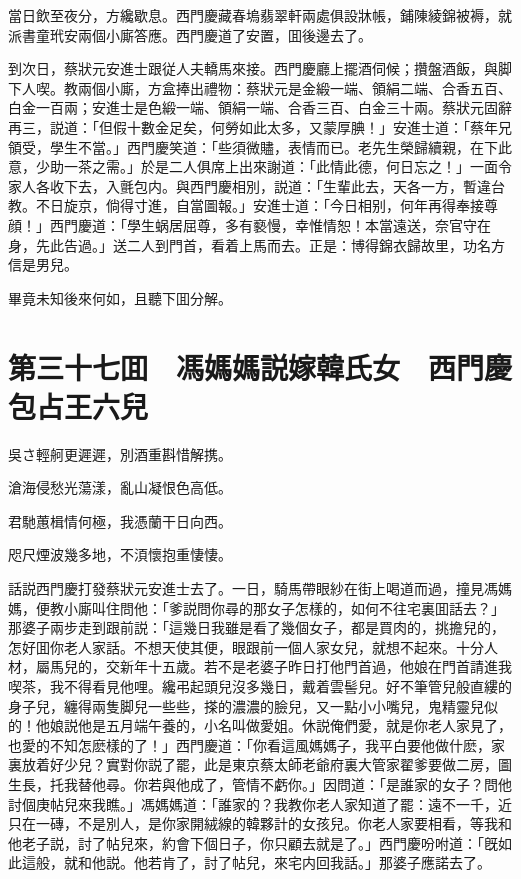 當日飲至夜分，方纔歇息。西門慶藏春塢翡翠軒兩處俱設牀帳，鋪陳綾錦被褥，就派書童玳安兩個小廝答應。西門慶道了安置，囬後邊去了。

到次日，蔡狀元安進士跟従人夫轎馬來接。西門慶廳上擺酒伺候；攢盤酒飯，與脚下人喫。教兩個小廝，方盒捧出禮物：蔡狀元是金緞一端、領絹二端、合香五百、白金一百兩；安進士是色緞一端、領絹一端、合香三百、白金三十兩。蔡狀元固辭再三，説道：「但假十數金足矣，何勞如此太多，又蒙厚腆！」安進士道：「蔡年兄領受，學生不當。」西門慶笑道：「些須微贐，表情而已。老先生榮歸續親，在下此意，少助一茶之需。」於是二人俱席上出來謝道：「此情此德，何日忘之！」一面令家人各收下去，入氈包内。與西門慶相別，説道：「生輩此去，天各一方，暫違台教。不日旋京，倘得寸進，自當圖報。」安進士道：「今日相别，何年再得奉接尊顔！」西門慶道：「學生蜗居屈尊，多有褻慢，幸惟情恕！本當遠送，奈官守在身，先此告過。」送二人到門首，看着上馬而去。正是：博得錦衣歸故里，功名方信是男兒。

畢竟未知後來何如，且聽下囬分解。

\chapter*{第三十七囬　馮媽媽説嫁韓氏女　西門慶包占王六兒}

吳さ輕舸更遲遲，別酒重斟惜解携。

滄海侵愁光蕩漾，亂山凝恨色高低。

君馳蕙楫情何極，我憑蘭干日向西。

咫尺煙波幾多地，不湏懷抱重悽悽。

話説西門慶打發蔡狀元安進士去了。一日，騎馬帶眼紗在街上喝道而過，撞見馮媽媽，便教小廝叫住問他：「爹説問你尋的那女子怎樣的，如何不往宅裏囬話去？」那婆子兩步走到跟前説：「這幾日我雖是看了幾個女子，都是買肉的，挑擔兒的，怎好囬你老人家話。不想天使其便，眼跟前一個人家女兒，就想不起來。十分人材，屬馬兒的，交新年十五歲。若不是老婆子昨日打他門首過，他娘在門首請進我喫茶，我不得看見他哩。纔弔起頭兒沒多幾日，戴着雲髻兒。好不筆管兒般直縷的身子兒，纏得兩隻脚兒一些些，搽的濃濃的臉兒，又一點小小嘴兒，鬼精靈兒似的！他娘説他是五月端午養的，小名叫做愛姐。休説俺們愛，就是你老人家見了，也愛的不知怎麽樣的了！」西門慶道：「你看這風媽媽子，我平白要他做什麽，家裏放着好少兒？實對你説了罷，此是東京蔡太師老爺府裏大管家翟爹要做二房，圖生長，托我替他尋。你若與他成了，管情不虧你。」因問道：「是誰家的女子？問他討個庚帖兒來我瞧。」馮媽媽道：「誰家的？我教你老人家知道了罷：遠不一千，近只在一磚，不是別人，是你家開絨線的韓夥計的女孩兒。你老人家要相看，等我和他老子説，討了帖兒來，約會下個日子，你只顧去就是了。」西門慶吩咐道：「旣如此這般，就和他説。他若肯了，討了帖兒，來宅内回我話。」那婆子應諾去了。

